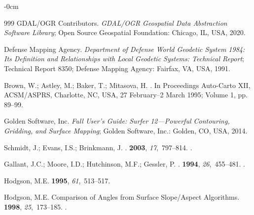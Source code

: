 \documentclass[technologies,article,accept,pdftex,moreauthors]{Definitions/mdpi}
\begin{document}
\begin{adjustwidth}{-\extralength}{0cm}
\begin{thebibliography}{999}
	GDAL/OGR Contributors. %
	\newblock \emph{GDAL/OGR Geospatial Data Abstraction Software Library};
	\newblock Open Source Geospatial Foundation: Chicago, IL, USA, 2020. %
	
	{Defense Mapping Agency}.
	\newblock \emph{Department of Defense World Geodetic System 1984: Its Definition and
		Relationships with Local Geodetic Systems: Technical Report};
	\newblock Technical Report 8350; Defense Mapping Agency: Fairfax, VA, USA,  1991. %
	
	Brown, W.; Astley, M.; Baker, T.; Mitasova, H.
	.
	\newblock In Proceedings Auto-Carto XII, ACSM/ASPRS, Charlotte, NC, USA, 27 February--2 March %
	1995; Volume 1, pp. 89--99.
	
	
	{Golden Software, Inc.}
	\newblock \emph{{Full User’s Guide: Surfer 12---Powerful Contouring, Gridding, and
			Surface Mapping}}; Golden Software, Inc.: Golden, CO, USA, 2014. %
	
	
	Schmidt, J.; Evans, I.S.; Brinkmann, J.
	.
	 {\bf
		2003}, {\em 17},~797--814.
	.
	
	Gallant, J.C.; Moore, I.D.; Hutchinson, M.F.; Gessler, P.
	.
	 {\bf 1994}, {\em 26},~455--481.
	.
	
	Hodgson, M.E.
	 {\bf 1995}, {\em
		61},~513--517.
	
	Hodgson, M.E.
	\newblock Comparison of Angles from Surface Slope/Aspect Algorithms.
	 {\bf 1998}, {\em
		25},~173--185.
	.
	

\end{thebibliography}
\end{adjustwidth}
\end{document}
